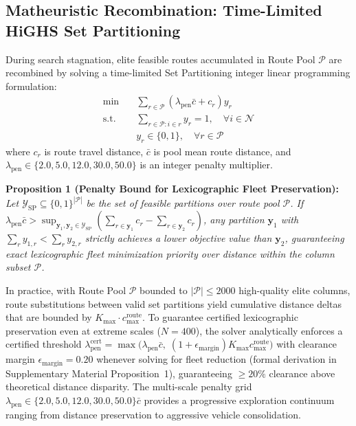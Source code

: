 \documentclass{ieeeaccess}
\begin{document}
\subsection{Matheuristic Recombination: Time-Limited HiGHS Set Partitioning}
\label{sec:set_partitioning}

During search stagnation, elite feasible routes accumulated in Route Pool $\mathcal{P}$ are recombined by solving a time-limited Set Partitioning integer linear programming formulation:
\begin{align}
  \min \quad &\sum_{r \in \mathcal{P}} \left( \lambda_{\text{pen}} \bar{c} + c_r \right) y_r \label{eq:sp_obj} \\
  \text{s.t.} \quad &\sum_{r \in \mathcal{P} : i \in r} y_r = 1, \quad \forall i \in \mathcal{N} \label{eq:sp_cover} \\
  &y_r \in \{0, 1\}, \quad \forall r \in \mathcal{P} \label{eq:sp_binary}
\end{align}
where $c_r$ is route travel distance, $\bar{c}$ is pool mean route distance, and $\lambda_{\text{pen}} \in \{2.0, 5.0, 12.0, 30.0, 50.0\}$ is an integer penalty multiplier. 

\vspace{1mm}
\noindent\textbf{Proposition 1 (Penalty Bound for Lexicographic Fleet Preservation):} \textit{Let $\mathcal{Y}_{\text{SP}} \subseteq \{0, 1\}^{|\mathcal{P}|}$ be the set of feasible partitions over route pool $\mathcal{P}$. If $\lambda_{\text{pen}} \bar{c} > \sup_{\mathbf{y}_1, \mathbf{y}_2 \in \mathcal{Y}_{\text{SP}}} \left( \sum_{r \in \mathbf{y}_1} c_r - \sum_{r \in \mathbf{y}_2} c_r \right)$, any partition $\mathbf{y}_1$ with $\sum_{r} y_{1, r} < \sum_{r} y_{2, r}$ strictly achieves a lower objective value than $\mathbf{y}_2$, guaranteeing exact lexicographic fleet minimization priority over distance within the column subset $\mathcal{P}$.}
\vspace{1mm}

In practice, with Route Pool $\mathcal{P}$ bounded to $|\mathcal{P}| \le 2000$ high-quality elite columns, route substitutions between valid set partitions yield cumulative distance deltas that are bounded by $K_{\max} \cdot c_{\max}^{\text{route}}$. To guarantee certified lexicographic preservation even at extreme scales ($N=400$), the solver analytically enforces a certified threshold $\lambda_{\text{pen}}^{\text{cert}} = \max\bigl(\lambda_{\text{pen}}\bar{c}, \; (1 + \epsilon_{\text{margin}}) K_{\max} c_{\max}^{\text{route}}\bigr)$ with clearance margin $\epsilon_{\text{margin}} = 0.20$ whenever solving for fleet reduction (formal derivation in Supplementary Material Proposition~1), guaranteeing $\ge 20\%$ clearance above theoretical distance disparity. The multi-scale penalty grid $\lambda_{\text{pen}} \in \{2.0, 5.0, 12.0, 30.0, 50.0\}\bar{c}$ provides a progressive exploration continuum ranging from distance preservation to aggressive vehicle consolidation.
\end{document}
